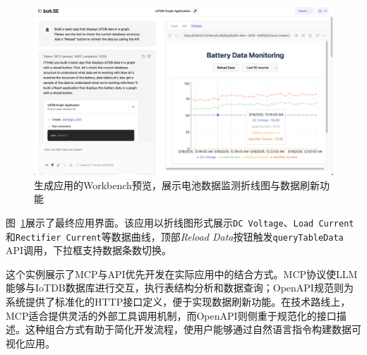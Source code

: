 \begin{figure}[H]
  \centering
  \includegraphics[width=\textwidth,height=0.75\textheight,keepaspectratio]{figures/screenshots/iotdb-demo/app-preview.png}
  \caption{生成应用的Workbench预览，展示电池数据监测折线图与数据刷新功能}
  \label{fig:app-preview}
\end{figure}

图~\ref{fig:app-preview}展示了最终应用界面。该应用以折线图形式展示\texttt{DC Voltage}、\texttt{Load Current}和\texttt{Rectifier Current}等数据曲线，顶部\textit{Reload Data}按钮触发\texttt{queryTableData} API调用，下拉框支持数据条数切换。

这个实例展示了MCP与API优先开发在实际应用中的结合方式。MCP协议使LLM能够与IoTDB数据库进行交互，执行表结构分析和数据查询；OpenAPI规范则为系统提供了标准化的HTTP接口定义，便于实现数据刷新功能。在技术路线上，MCP适合提供灵活的外部工具调用机制，而OpenAPI则侧重于规范化的接口描述。这种组合方式有助于简化开发流程，使用户能够通过自然语言指令构建数据可视化应用。